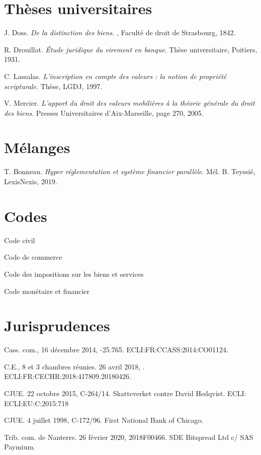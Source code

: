 {\section*{Thèses universitaires}
J. Doss. \emph{De la distinction des biens}. , Faculté de droit de Strasbourg, 1842.\par
R. Drouillat. \emph{Étude juridique du virement en banque}. Thèse universitaire, Poitiers, 1931.\par
C. Lassalas. \emph{L'inscription en compte des valeurs : la notion de propriété scripturale}. Thèse, LGDJ, 1997.\par
V. Mercier. \emph{L'apport du droit des valeurs mobilières à la théorie générale du droit des biens}. Presses Universitaires d'Aix-Marseille, page 270, 2005.\par

\section*{Mélanges}
T. Bonneau. \emph{Hyper réglementation et système financier parallèle}. Mél. B. Teyssié, LexisNexis, 2019.\par

\section*{Codes}
Code civil\par
Code de commerce\par
Code des impositions sur les biens et services\par
Code monétaire et financier\par

\section*{Jurisprudences}
Cass. com., 16 décembre 2014, -25.765. ECLI:FR:CCASS:2014:CO01124.\par
C.E., 8 et 3 chambres réunies. 26 avril 2018, . ECLI:FR:CECHR:2018:417809.20180426.\par
CJUE. 22 octobre 2015, C-264/14. Skatteverket contre David Hedqvist. ECLI: ECLI:EU:C:2015:718\par
CJUE. 4 juillet 1998, C-172/96. First National Bank of Chicago.\par
Trib. com. de Nanterre. 26 février 2020, \no 2018F00466. SDE Bitspread Ltd c/ SAS Paymium.\par




}
